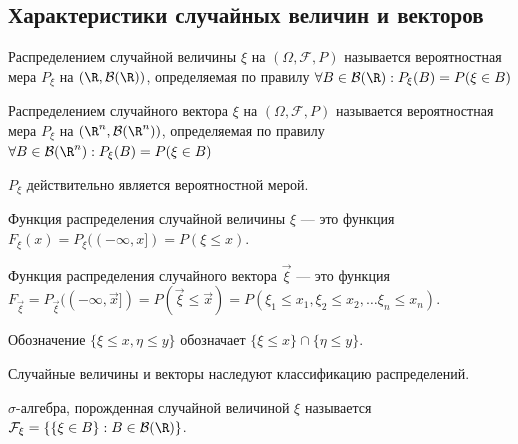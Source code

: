 \subsection{Характеристики случайных величин и векторов}
\begin{definition}
    Распределением случайной величины \(\xi\) на \((\Omega, \mathcal{F}, P)\) называется вероятностная мера \(P_\xi\) на \((\R, \mathcal{B}(\R))\), определяемая по правилу \(\forall B \in \mathcal{B}(\R): P_\xi(B) = P(\xi \in B)\)
\end{definition}

\begin{definition}
    Распределением случайного вектора \(\xi\) на \((\Omega, \mathcal{F}, P)\) называется вероятностная мера \(P_\xi\) на \((\R^n, \mathcal{B}(\R^n))\), определяемая по правилу \(\forall B \in \mathcal{B}(\R^n): P_\xi(B) = P(\xi \in B)\)
\end{definition}

\begin{exercise}
    \(P_\xi\) действительно является вероятностной мерой.
\end{exercise}

\begin{definition}
    Функция распределения случайной величины \(\xi\) --- это функция \(F_\xi(x) = P_\xi((-\infty, x]) = P(\xi \le x)\).
\end{definition}

\begin{definition}
    Функция распределения случайного вектора \(\vec{\xi}\) --- это функция \(F_{\vec{\xi}} = P_{\vec{\xi}}((-\infty, \vec{x}]) = P(\vec{\xi} \le \vec{x}) = P(\xi_1 \le x_1, \xi_2 \le x_2, \dots \xi_n \le x_n)\).
\end{definition}

\begin{note}
    Обозначение \(\{\xi \le x, \eta \le y\}\) обозначает \(\{\xi \le x\} \cap \{\eta \le y\}\).
\end{note}

\begin{note}
    Случайные величины и векторы наследуют классификацию распределений.
\end{note}

\begin{definition}
    \(\sigma\)-алгебра, порожденная случайной величиной \(\xi\) называется \(\mathcal{F}_\xi = \{\{\xi \in B\}: B \in \mathcal{B}(\R)\}\).
\end{definition}

